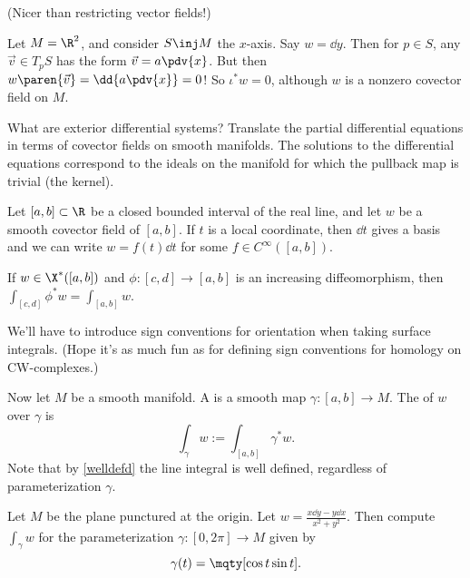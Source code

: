 (Nicer than restricting vector fields!) 

\begin{ex}[]
    Let $M = \R^2$, and consider $S \inj M$ the $x$-axis. Say $w = \dd{y}$. Then for $p \in S$, any $\vec v \in T_p S$ has the form $\vec v = a \pdv{x}$. But then $w \paren{\vec v} = \dd{a \pdv{x} } = 0$! So $\iota^* w = 0$, although $w$ is a nonzero covector field on $M$.
\end{ex}

\begin{note}[]
    What are exterior differential systems? Translate the partial differential equations in terms of covector fields on smooth manifolds. The solutions to the differential equations correspond to the ideals on the manifold for which the pullback map is trivial (the kernel).
\end{note}

\begin{ex}
    Let $[a,b] \subset \R$ be a closed bounded interval of the real line, and let $w$ be a smooth covector field of $[a,b]$. If $t$ is a local coordinate, then $\dd{t}$ gives a basis and we can write $w = f(t)\dd{t}$ for some $f \in C^\infty([a,b])$.
\end{ex}

\begin{prop}[]
    \label{welldefd}
    If $w \in \X^*([a,b])$ and $\phi \colon [c,d] \to [a,b]$ is an increasing diffeomorphism, then $\int_{[c,d]} \phi^* w = \int_{[a,b]} w$.
\end{prop}

We'll have to introduce sign conventions for orientation when taking surface integrals. (Hope it's as much fun as for defining sign conventions for homology on CW-complexes.)

\begin{defn}[]
    Now let $M$ be a smooth manifold. A  is a smooth map $\gamma \colon [a,b] \to M$. The  of $w$ over $\gamma$ is
    \begin{equation*}
        \int_\gamma w := \int_{[a,b]} \gamma^* w.
    \end{equation*}
    Note that by \ref{welldefd} the line integral is well defined, regardless of parameterization $\gamma$.
\end{defn}

\begin{todo}[]
    Let $M$ be the plane punctured at the origin. Let $w = \frac{x \dd{y} - y \dd{x} }{x^2 + y^2}$. Then compute $\int_\gamma w$ for the parameterization $\gamma \colon [0, 2\pi] \to M$ given by 
    \begin{equation*}
        \gamma(t) = \mqty[\cos t\\ \sin t].
    \end{equation*}
\end{todo}

